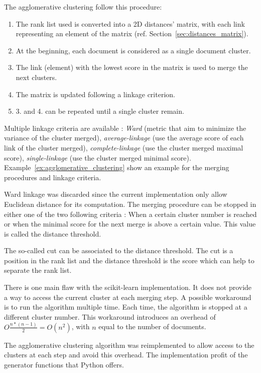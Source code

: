 The agglomerative clustering follow this procedure:
\begin{enumerate}
  \item The rank list used is converted into a 2D distances' matrix, with each link representing an element of the matrix (ref. Section~\ref{sec:distances_matrix}).
  \item At the beginning, each document is considered as a single document cluster.
  \item The link (element) with the lowest score in the matrix is used to merge the next clusters.
  \item The matrix is updated following a linkage criterion.
  \item 3. and 4. can be repeated until a single cluster remain.
\end{enumerate}

Multiple linkage criteria are available : \textit{Ward} (metric that aim to minimize the variance of the cluster merged), \textit{average-linkage} (use the average score of each link of the cluster merged), \textit{complete-linkage} (use the cluster merged maximal score), \textit{single-linkage} (use the cluster merged minimal score).
Example~\ref{ex:agglomerative_clustering} show an example for the merging procedures and linkage criteria.

Ward linkage was discarded since the current implementation only allow Euclidean distance for its computation.
The merging procedure can be stopped in either one of the two following criteria : When a certain cluster number is reached or when the minimal score for the next merge is above a certain value.
This value is called the distance threshold.

The so-called cut can be associated to the distance threshold.
The cut is a position in the rank list and the distance threshold is the score which can help to separate the rank list.

There is one main flaw with the scikit-learn implementation.
It does not provide a way to access the current cluster at each merging step.
A possible workaround is to run the algorithm multiple time.
Each time, the algorithm is stopped at a different cluster number.
This workaround introduces an overhead of $O\frac{n * (n - 1)}{2} = O(n^2)$, with $n$ equal to the number of documents.

The agglomerative clustering algorithm was reimplemented to allow access to the clusters at each step and avoid this overhead.
The implementation profit of the generator functions that Python offers.

